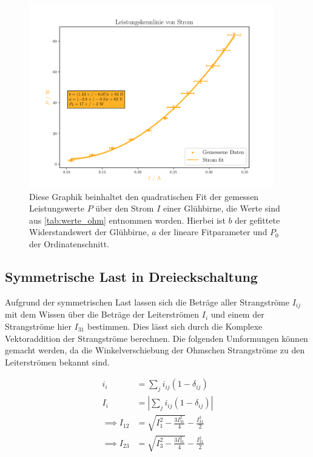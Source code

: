 \documentclass[12pt,english,ngerman]{scrartcl}
\begin{document}
\begin{figure}[H]
	\begin{center}
		\includegraphics[width = 0.95\textwidth]{figures/pIkennlinie.pdf}
	\end{center}
	\caption[Stromabhängige Leistungskurve einer Glühbirne]{Diese Graphik beinhaltet den
		quadratischen Fit der gemessen Leistungswerte $P$ über den Strom $I$ einer
		Glühbirne, die Werte sind aus \autoref{tab:werte_ohm} entnommen worden. Hierbei
		ist $b$ der gefittete Widerstandswert der Glühbirne, $a$ der lineare
		Fitparameter und $P_0$ der Ordinatenschnitt.
	}\label{fig:pIkennlinie}
\end{figure}

\subsection{Symmetrische Last in Dreieckschaltung}\label{sec:ausw_dreieck}

Aufgrund der symmetrischen Last lassen sich die Beträge aller Strangströme
$I_{ij}$ mit dem Wissen über die Beträge der Leiterströmen $I_i$ und einem der
Strangströme hier $I_{31}$ bestimmen. Dies lässt sich durch die Komplexe
Vektoraddition der Strangströme berechnen. Die folgenden Umformungen können
gemacht werden, da die Winkelverschiebung der Ohmschen Strangströme zu den
Leiterströmen bekannt sind.

\begin{align}
	i_{i}           & = \sum_{j} i_{ij} (1-\delta_{ij})                                                    \\
	I_{i}           & = |\sum_{j} i_{ij} (1-\delta_{ij})|                                                  \\
	\implies I_{12} & = \sqrt{I_1^2-\frac{3I_{31}^2}{4}}-\frac{I_{31}^2}{2}                                \\
	\implies I_{23} & = \sqrt{I_3^2-\frac{3I_{31}^2}{4}}-\frac{I_{31}^2}{2}\label{eq:complexstromaddition}
\end{align}
\end{document}
